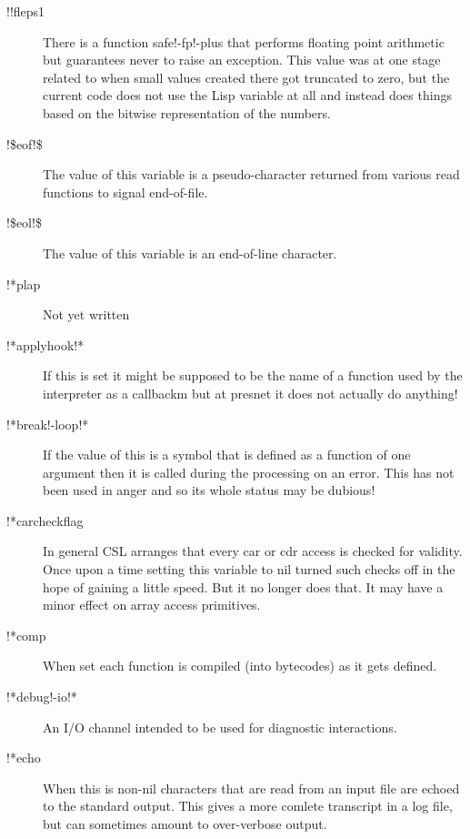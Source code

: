 \documentclass[a4paper,11pt]{article}
\begin{document}
\begin{description}

\item [{\ttfamily !!fleps1}]
There is a function safe!-fp!-plus that performs floating point
arithmetic but guarantees never to raise an exception. This value was
at one stage related to when small values created there got truncated to zero,
but the current code does not use the Lisp variable at all and instead does
things based on the bitwise representation of the numbers.

\item [{\ttfamily !\$eof!\$}]
The value of this variable is a pseudo-character returned from various
read functions to signal end-of-file.

\item [{\ttfamily !\$eol!\$}]
The value of this variable is an end-of-line character.

\item [{\ttfamily !*plap}]
Not yet written

\item [{\ttfamily !*applyhook!*}]
If this is set it might be supposed to be the name of a function used
by the interpreter as a callbackm but at presnet it does not actually do
anything!

\item [{\ttfamily !*break!-loop!*}]
If the value of this is a symbol that is defined as a function of one
argument then it is called during the processing on an error. This has not
been used in anger and so its whole status may be dubious!

\item [{\ttfamily !*carcheckflag}]
In general CSL arranges that every {\ttfamily car} or {\ttfamily cdr} access
is checked for validity. Once upon a time setting this variable to nil
turned such checks off in the hope of gaining a little speed. But it no
longer does that. It may have a minor effect on array access primitives.

\item [{\ttfamily !*comp}]
When set each function is compiled (into bytecodes) as it gets defined.

\item [{\ttfamily !*debug!-io!*}]
An I/O channel intended to be used for diagnostic interactions.

\item [{\ttfamily !*echo}]
When this is non-nil characters that are read from an input file are
echoed to the standard output. This gives a more comlete transcript in
a log file, but can sometimes amount to over-verbose output.


\end{description}
\end{document}
